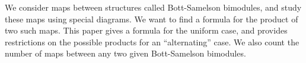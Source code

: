 
We consider maps between structures called Bott-Samelson bimodules, and study these maps using special diagrams.  We want to find a formula for the product of two such maps.  This paper gives a formula for the uniform case, and provides restrictions on the possible products for an ``alternating'' case.  We also count the number of maps between any two given Bott-Samelson bimodules.

